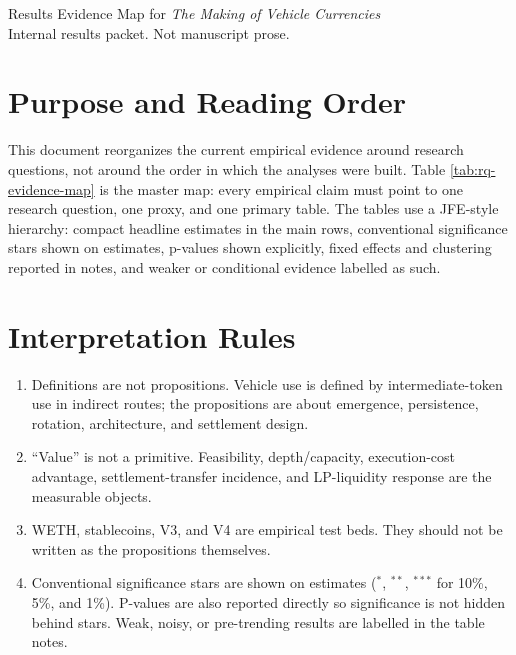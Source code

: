 \documentclass[12pt]{article}
\begin{document}
\begin{center}

{\Large Results Evidence Map for \textit{The Making of Vehicle Currencies}}\\[0.5em]

{\normalsize Internal results packet. Not manuscript prose.}

\end{center}

\onehalfspacing

\section*{Purpose and Reading Order}

This document reorganizes the current empirical evidence around research questions, not around the order in which the analyses were built. Table \ref{tab:rq-evidence-map} is the master map: every empirical claim must point to one research question, one proxy, and one primary table. The tables use a JFE-style hierarchy: compact headline estimates in the main rows, conventional significance stars shown on estimates, p-values shown explicitly, fixed effects and clustering reported in notes, and weaker or conditional evidence labelled as such.

\section*{Interpretation Rules}

\begin{enumerate}

\item Definitions are not propositions. Vehicle use is defined by intermediate-token use in indirect routes; the propositions are about emergence, persistence, rotation, architecture, and settlement design.

\item ``Value'' is not a primitive. Feasibility, depth/capacity, execution-cost advantage, settlement-transfer incidence, and LP-liquidity response are the measurable objects.

\item WETH, stablecoins, V3, and V4 are empirical test beds. They should not be written as the propositions themselves.

\item Conventional significance stars are shown on estimates ($^{*}$, $^{**}$, $^{***}$ for 10\%, 5\%, and 1\%). P-values are also reported directly so significance is not hidden behind stars. Weak, noisy, or pre-trending results are labelled in the table notes.

\end{enumerate}
\end{document}
